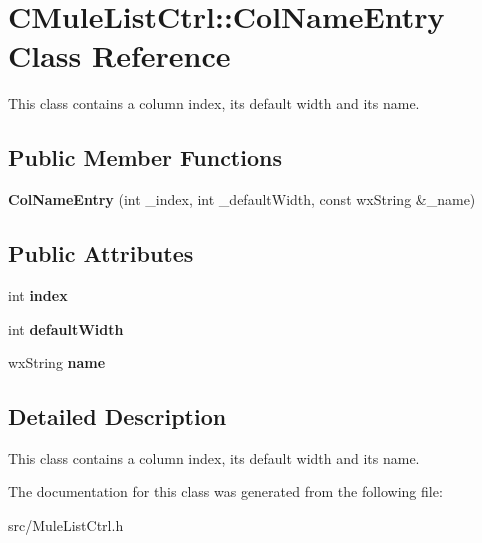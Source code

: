\section{CMuleListCtrl::ColNameEntry Class Reference}
\label{classCMuleListCtrl_1_1ColNameEntry}


This class contains a column index, its default width and its name.  
\subsection*{Public Member Functions}
\begin{DoxyCompactItemize}
\item 
{\bfseries ColNameEntry} (int \_\-index, int \_\-defaultWidth, const wxString \&\_\-name)\label{classCMuleListCtrl_1_1ColNameEntry_a3443ae60c4d37e34f20f8e9c7972f1ae}

\end{DoxyCompactItemize}
\subsection*{Public Attributes}
\begin{DoxyCompactItemize}
\item 
int {\bfseries index}\label{classCMuleListCtrl_1_1ColNameEntry_a73b4a50229766099b9a5423801fb39df}

\item 
int {\bfseries defaultWidth}\label{classCMuleListCtrl_1_1ColNameEntry_a6870c58646e5530e704bfbe6cd2b92cb}

\item 
wxString {\bfseries name}\label{classCMuleListCtrl_1_1ColNameEntry_adaf0c814e61c365563544e98a042e328}

\end{DoxyCompactItemize}


\subsection{Detailed Description}
This class contains a column index, its default width and its name. 

The documentation for this class was generated from the following file:\begin{DoxyCompactItemize}
\item 
src/MuleListCtrl.h\end{DoxyCompactItemize}

